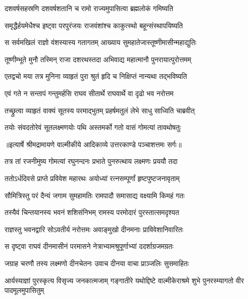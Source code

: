 \twolineshloka
{दशवर्षसहस्रणि दशवर्षशतानि च}
{रामो राज्यमुपासित्वा ब्रह्मलोकं गमिष्यति} %

\twolineshloka
{समृद्धैर्हयमेधैश्च इष्ट्वा परपुरंजयः}
{राजवंशांश्च काकुत्स्थो बहून्संस्थापयिष्यति} %

\twolineshloka
{स सर्वमखिलं राज्ञो वंशस्यास्य गतागतम्}
{आख्याय सुमहातेजास्तूष्णीमासीन्महाद्युतिः} %

\twolineshloka
{तूष्णीम्भूते मुनौ तस्मिन् राजा दशरथस्तदा}
{अभिवाद्य महात्मानौ पुनरायात्पुरोत्तमम्} %

\twolineshloka
{एतद्वचो मया तत्र मुनिना व्याहृतं पुरा}
{श्रुतं हृदि च निक्षिप्तं नान्यथा तद्भविष्यति} %

\twolineshloka
{एवं गते न सन्तापं गन्तुमर्हसि राघव}
{सीतार्थे राघवार्थे वा दृढो भव नरोत्तम} %

\twolineshloka
{तच्छ्रुत्वा व्याहृतं वाक्यं सूतस्य परमाद्भुतम्}
{प्रहर्षमतुलं लेभे साधु साध्विति चाब्रवीत्} %

\twolineshloka
{तयोः संवदतोरेवं सूतलक्ष्मणयोः पथि}
{अस्तमर्को गतो वासं गोमत्यां तावथोषतुः} %


{॥इत्यार्षे श्रीमद्रामायणे वाल्मीकीये आदिकाव्ये उत्तरकाण्डे पञ्चाशत्तमः सर्गः॥}


\twolineshloka
{तत्र तां रजनीमुष्य गोमत्यां रघुनन्दनः}
{प्रभाते पुनरुत्थाय लक्ष्मणः प्रययौ तदा} %

\twolineshloka
{ततोऽर्धदिवसे प्राप्ते प्रविवेश महारथः}
{अयोध्यां रत्नसम्पूर्णां हृष्टपुष्टजनावृताम्} %

\twolineshloka
{सौमित्रिस्तु परं दैन्यं जगाम सुमहामतिः}
{रामपादौ समासाद्य वक्ष्यामि किमहं गतः} %

\twolineshloka
{तस्यैवं चिन्तयानस्य भवनं शशिसंनिभम्}
{रामस्य परमोदारं पुरस्तात्समदृश्यत} %

\twolineshloka
{राज्ञस्तु भवनद्वारि सोऽवतीर्य नरोत्तमः}
{अवाङ्मुखो दीनमनाः प्राविवेशानिवारितः} %

\twolineshloka
{स दृष्ट्वा राघवं दीनमासीनं परमासने}
{नेत्राभ्यामश्रुपूर्णाभ्यां ददर्शाग्रजमग्रतः} %

\twolineshloka
{जग्राह चरणौ तस्य लक्ष्मणो दीनचेतनः}
{उवाच दीनया वाचा प्राञ्जलिः सुसमाहितः} %

\threelineshloka
{आर्यस्याज्ञां पुरस्कृत्य विसृज्य जनकात्मजाम्}
{गङ्गातीरे यथोद्दिष्टे वाल्मीकेराश्रमे शुभे}
{पुनरस्म्यागतो वीर पादमूलमुपासितुम्} %

